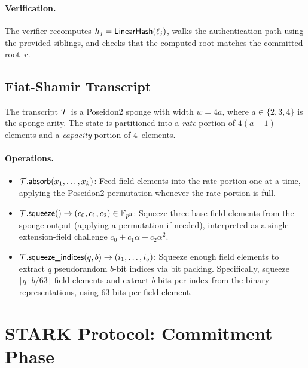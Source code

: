 \paragraph{Verification.}
The verifier recomputes $h_j = \textsf{LinearHash}(\ell_j)$, walks the authentication path
using the provided siblings, and checks that the computed root matches the
committed root~$r$.

\subsection{Fiat-Shamir Transcript}
\label{sec:transcript}

The transcript $\mathcal{T}$ is a Poseidon2 sponge with width $w = 4a$,
where $a \in \{2, 3, 4\}$ is the sponge arity.
The state is partitioned into a \emph{rate} portion of $4(a-1)$ elements
and a \emph{capacity} portion of $4$~elements.

\paragraph{Operations.}

\begin{itemize}[nosep]
  \item $\mathcal{T}.\textsf{absorb}(x_1, \ldots, x_k)$:
        Feed field elements into the rate portion one at a time,
        applying the Poseidon2 permutation whenever the rate portion is full.

  \item $\mathcal{T}.\textsf{squeeze}() \to (c_0, c_1, c_2) \in \mathbb{F}_{p^3}$:
        Squeeze three base-field elements from the sponge output
        (applying a permutation if needed),
        interpreted as a single extension-field challenge
        $c_0 + c_1\alpha + c_2\alpha^2$.

  \item $\mathcal{T}.\textsf{squeeze\_indices}(q, b) \to (i_1, \ldots, i_q)$:
        Squeeze enough field elements to extract $q$ pseudorandom $b$-bit
        indices via bit packing.
        Specifically, squeeze $\lceil q \cdot b / 63 \rceil$ field elements
        and extract $b$ bits per index from the binary representations,
        using 63 bits per field element.
\end{itemize}

\section{STARK Protocol: Commitment Phase}
\label{sec:commitment-phase}

